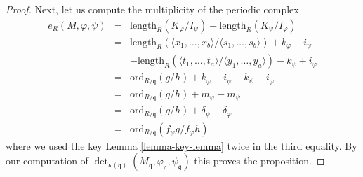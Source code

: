 \begin{proof}
\medskip\noindent
Next, let us compute the multiplicity of the periodic complex
\begin{eqnarray*}
e_R(M, \varphi, \psi) & = &
\text{length}_R(K_\varphi/I_\psi) - \text{length}_R(K_\psi/I_\varphi) \\
& = &
\text{length}_R(
\langle x_1, \ldots, x_b\rangle/
\langle s_1, \ldots, s_b\rangle)
+ k_\varphi - i_\psi \\
& & -
\text{length}_R(
\langle t_1, \ldots, t_a\rangle/
\langle y_1, \ldots, y_a\rangle)
- k_\psi + i_\varphi \\
& = &
\text{ord}_{R/\mathfrak q}(g/h) + k_\varphi - i_\psi - k_\psi + i_\varphi \\
& = &
\text{ord}_{R/\mathfrak q}(g/h) + m_\varphi - m_\psi \\
& = &
\text{ord}_{R/\mathfrak q}(g/h) + \delta_\psi - \delta_\varphi \\
& = &
\text{ord}_{R/\mathfrak q}(f_\psi g/f_\varphi h)
\end{eqnarray*}
where we used the key Lemma \ref{lemma-key-lemma} twice in the third equality.
By our computation of $\det_{\kappa(\mathfrak q)}
(M_{\mathfrak q}, \varphi_{\mathfrak q}, \psi_{\mathfrak q})$
this proves the proposition.
\end{proof}
